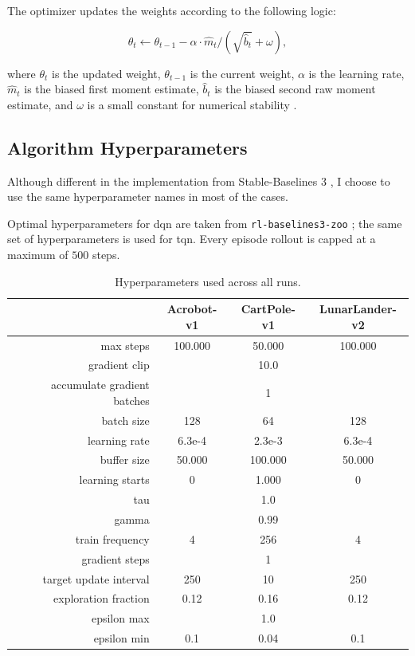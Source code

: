 The optimizer updates the weights according to the following logic:

$$
\theta_t \leftarrow \theta_{t-1}  - \alpha \cdot \hat{m}_t / (\sqrt{\hat{b}_t} + \omega),
$$

where $\theta_t$ is the updated weight, $\theta_{t-1}$ is the current weight, $\alpha$ is the learning rate, $\hat{m}_t$ is the biased first moment estimate, $\hat{b}_t$ is the biased second raw moment estimate, and $\omega$ is a small constant for numerical stability \cite{adam}.

\subsection{Algorithm Hyperparameters}
Although different in the implementation from Stable-Baselines 3 \cite{sb3}, I choose to use the same hyperparameter names in most of the cases.

Optimal hyperparameters for \acrshort{dqn} are taken from \texttt{rl-baselines3-zoo} \cite{rl_zoo3}; the same set of hyperparameters is used for \acrshort{tqn}. Every episode rollout is capped at a maximum of $500$ steps.

\begin{table}[!htbp]
\caption{Hyperparameters used across all runs.}
\label{table:hyperparameters}
\centering
\begin{tabular}{@{} r c c c @{}}
\toprule
& \textbf{Acrobot-v1} & \textbf{CartPole-v1} & \textbf{LunarLander-v2} \\
\midrule
max steps                   & 100.000 &  50.000 & 100.000 \\
gradient clip               &         &    10.0 &         \\
accumulate gradient batches &         &       1 &         \\
batch size                  &     128 &      64 &     128 \\
learning rate               &  6.3e-4 &  2.3e-3 &  6.3e-4 \\
buffer size                 &  50.000 & 100.000 &  50.000 \\
learning starts             &       0 &   1.000 &       0 \\
tau                         &         &     1.0 &         \\
gamma                       &         &    0.99 &         \\
train frequency             &       4 &     256 &       4 \\
gradient steps              &         &       1 &         \\
target update interval      &     250 &      10 &     250 \\
exploration fraction        &    0.12 &    0.16 &    0.12 \\
epsilon max                 &         &     1.0 &         \\
epsilon min                 &     0.1 &    0.04 &     0.1 \\
\bottomrule
\end{tabular}
\end{table}

